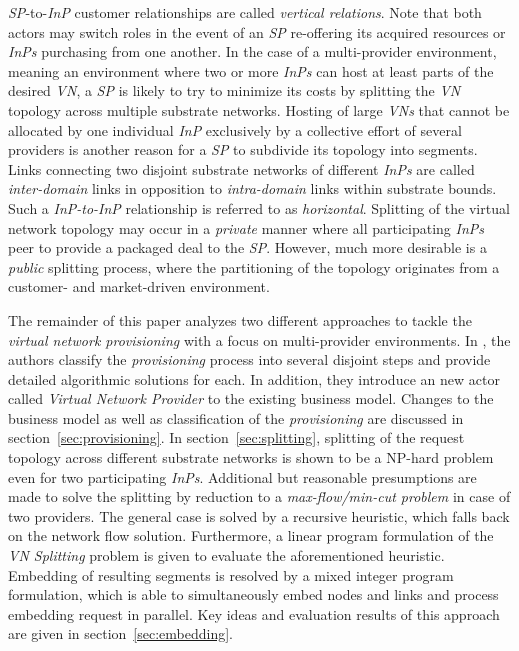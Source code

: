 \documentclass[prodmode,acmtomccap]{acmlarge}
\begin{document}
\emph{SP}-to-\emph{InP} customer relationships are called \emph{vertical relations}. Note that both actors may switch roles in the event of an 
\emph{SP} re-offering its acquired resources or \emph{InPs} purchasing from one another.
 In the case of a multi-provider environment, meaning an environment where two or more
\emph{InPs} can host at least parts of the desired \emph{VN}, a \emph{SP} is likely to try to minimize its costs by splitting the \emph{VN} topology across multiple substrate networks.
Hosting of large \emph{VNs} that cannot be allocated by one individual \emph{InP} exclusively by a collective effort of several providers is another reason for a \emph{SP}
to subdivide its topology into segments.
Links connecting two disjoint substrate networks of different \emph{InPs} are called \emph{inter-domain} links in opposition to 
\emph{intra-domain} links within substrate bounds. Such a \emph{InP-to-InP} relationship is referred to as \emph{horizontal}. 
Splitting of the virtual network topology may occur in a \emph{private} manner where all participating \emph{InPs} peer
to provide a packaged deal to the \emph{SP}. However, much more desirable is a \emph{public} splitting process, where the partitioning of the topology originates from a customer- and
market-driven environment.

The remainder of this paper analyzes two different approaches to tackle the \emph{virtual network provisioning} with a focus on multi-provider environments.
In , the authors classify the \emph{provisioning} process into several disjoint steps and provide detailed algorithmic solutions for each.
In addition, they introduce an new actor called \emph{Virtual Network Provider} to the existing business model. Changes to the business model as well as
classification of the \emph{provisioning} are discussed in section~\ref{sec:provisioning}.
In section~\ref{sec:splitting}, splitting of the request topology across different substrate networks is shown to be a NP-hard problem even for two participating \emph{InPs}. 
Additional but reasonable presumptions are made to solve the splitting by reduction to a \emph{max-flow/min-cut problem} in case of two providers.
The general case is solved by a recursive heuristic, which falls back on the network flow solution. Furthermore, a linear program formulation of the \emph{VN Splitting} problem
is given to evaluate the aforementioned heuristic.
Embedding of resulting segments is resolved by a mixed integer program formulation, which is able to simultaneously embed nodes and links and process embedding request in parallel.
Key ideas and evaluation results of this approach are given in section~\ref{sec:embedding}.
\end{document}
